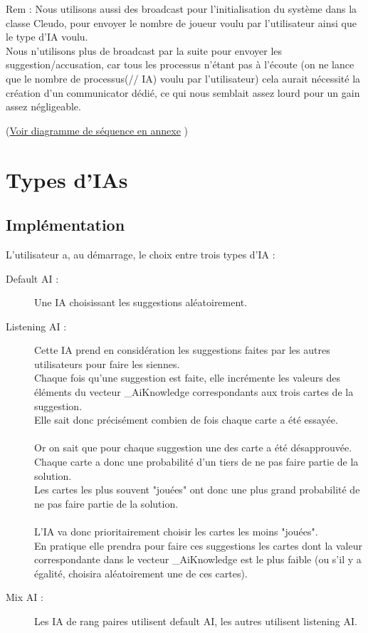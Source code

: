 \documentclass[a4paper,10pt]{article}
\begin{document}
		Rem : Nous utilisons aussi des broadcast pour l'initialisation du système dans la classe Cleudo, pour envoyer le nombre de joueur voulu par l'utilisateur ainsi que le type d'IA voulu.\\
		Nous n'utilisons plus de broadcast par la suite pour envoyer les suggestion/accusation, car tous les processus n'étant pas à l'écoute (on ne lance que le nombre de processus(// IA) voulu par l'utilisateur) cela aurait nécessité la création d'un communicator dédié, ce qui nous semblait assez lourd pour un gain assez négligeable.
		
	(\hyperlink{seqDiag}{Voir diagramme de séquence en annexe} )
	
		
		
		
\section{Types d'IAs}


	\subsection{Implémentation}
		L'utilisateur a, au démarrage, le choix entre trois types d'IA :
		\begin{description}
			\item[Default AI :] Une IA choisissant les suggestions aléatoirement.
			
			\item[Listening AI :] Cette IA prend en considération les suggestions faites par les autres utilisateurs pour faire les siennes.\\
					Chaque fois qu'une suggestion est faite, elle incrémente les valeurs des éléments du vecteur \_AiKnowledge correspondants aux trois cartes de la suggestion.\\
					Elle sait donc précisément combien de fois chaque carte a été essayée.\\
					~\\
					Or on sait que pour chaque suggestion une des carte a été désapprouvée. Chaque carte a donc une probabilité d'un tiers de ne pas faire partie de la solution.\\
					Les cartes les plus souvent "jouées" ont donc une plus grand probabilité de ne pas faire partie de la solution.\\
					~\\
					L'IA va donc prioritairement choisir les cartes les moins "jouées".\\
					En pratique elle prendra pour faire ces suggestions les cartes dont la valeur correspondante dans le vecteur \_AiKnowledge est le plus faible (ou s'il y a égalité, choisira aléatoirement une de ces cartes).
			\item[Mix AI :] Les IA de rang paires utilisent default AI, les autres utilisent listening AI.
		\end{description}
\end{document}
